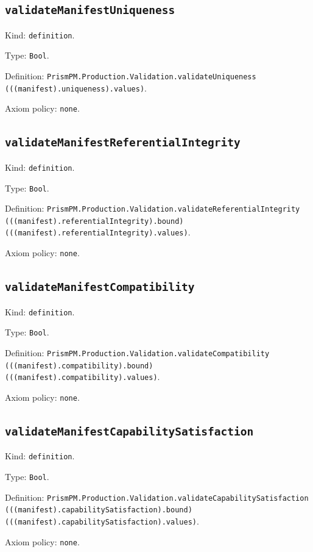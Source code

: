 \documentclass[11pt]{article}
\begin{document}
\subsection*{\texttt{validateManifestUniqueness}}
\noindent Kind: \texttt{definition}.\par
\noindent Type: \texttt{Bool}.\par
\noindent Definition: \texttt{PrismPM.Production.Validation.validateUniqueness (((manifest).uniqueness).values)}.\par
\noindent Axiom policy: \texttt{none}.\par
\subsection*{\texttt{validateManifestReferentialIntegrity}}
\noindent Kind: \texttt{definition}.\par
\noindent Type: \texttt{Bool}.\par
\noindent Definition: \texttt{PrismPM.Production.Validation.validateReferentialIntegrity (((manifest).referentialIntegrity).bound) (((manifest).referentialIntegrity).values)}.\par
\noindent Axiom policy: \texttt{none}.\par
\subsection*{\texttt{validateManifestCompatibility}}
\noindent Kind: \texttt{definition}.\par
\noindent Type: \texttt{Bool}.\par
\noindent Definition: \texttt{PrismPM.Production.Validation.validateCompatibility (((manifest).compatibility).bound) (((manifest).compatibility).values)}.\par
\noindent Axiom policy: \texttt{none}.\par
\subsection*{\texttt{validateManifestCapabilitySatisfaction}}
\noindent Kind: \texttt{definition}.\par
\noindent Type: \texttt{Bool}.\par
\noindent Definition: \texttt{PrismPM.Production.Validation.validateCapabilitySatisfaction (((manifest).capabilitySatisfaction).bound) (((manifest).capabilitySatisfaction).values)}.\par
\noindent Axiom policy: \texttt{none}.\par
\end{document}
